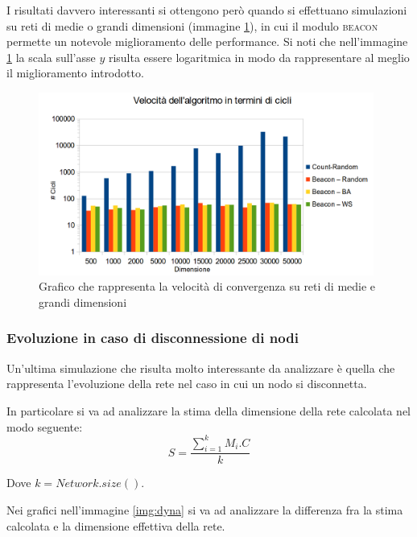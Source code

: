 \documentclass[a4paper,12pt]{article}
\begin{document}
I risultati davvero interessanti si ottengono per\`o quando si effettuano simulazioni su reti di medie o grandi dimensioni (immagine \ref{img:speed}), in cui il modulo \textsc{beacon} permette un notevole miglioramento delle performance. Si noti che nell'immagine \ref{img:speed} la scala sull'asse $y$ risulta essere logaritmica in modo da rappresentare al meglio il miglioramento introdotto.

\begin{figure}[ht]
\centering
\includegraphics[height=6cm]{speed.png}
\caption{Grafico che rappresenta la velocit\`a di convergenza su reti di medie e grandi dimensioni}
\label{img:speed}
\end{figure}

\subsubsection{Evoluzione in caso di disconnessione di nodi}

Un'ultima simulazione che risulta molto interessante da analizzare \`e quella che rappresenta l'evoluzione della rete nel caso in cui un nodo si disconnetta.

In particolare si va ad analizzare la stima della dimensione della rete calcolata nel modo seguente:
\begin{equation}\label{eq:stima}
S = \frac{\sum\limits_{i=1}^{k} M_i.C}{k}
\end{equation}

Dove $k = Network.size()$. 

Nei grafici nell'immagine \ref{img:dyna} si va ad analizzare la differenza fra la stima calcolata e la dimensione effettiva della rete.
\end{document}

